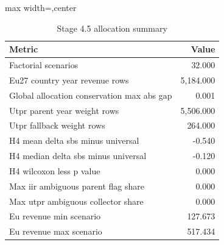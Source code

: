 \begin{table}[H]
\centering
\scriptsize
\caption{Stage 4.5 allocation summary}
\label{tab:app_stage45_summary}
\begin{adjustbox}{max width=\textwidth,center}
\begin{tabular}{@{}lr@{}}
\toprule
Metric & Value \\
\midrule
Factorial scenarios &              32.000 \\
Eu27 country year revenue rows &           5,184.000 \\
Global allocation conservation max abs gap &               0.001 \\
Utpr parent year weight rows &           5,506.000 \\
Utpr fallback weight rows &             264.000 \\
H4 mean delta sbs minus universal &  -0.540 \\
H4 median delta sbs minus universal &  -0.120 \\
H4 wilcoxon less p value &               0.000 \\
Max iir ambiguous parent flag share &               0.000 \\
Max utpr ambiguous collector share &               0.000 \\
Eu revenue min scenario & 127.673 \\
Eu revenue max scenario & 517.434 \\
\bottomrule
\end{tabular}
\end{adjustbox}
\end{table}
